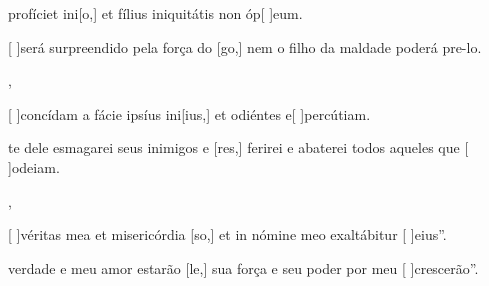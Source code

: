 {    {\item {} profíciet ini[o,] et fílius iniquitátis non óp[ ]{e}um.}%
        {\item {}[ ]{se}rá surpreendido pela força do [go,] nem o filho da maldade poderá pre-lo.},
    {\item {}[ ]{con}cídam a fácie ipsíus ini[ius,] et odiéntes e[ ]{per}{cú}tiam.}%
        {\item {}te dele esmagarei seus inimigos e [res,] ferirei e abaterei todos aqueles que [ ]{o}{dei}am.},
    {\item {}[ ]{vé}ritas mea et misericórdia [so,] et in nómine meo exaltábitur [ ]{e}ius''.}%
        {\item {} verdade e meu amor estarão [le,] sua força e seu poder por meu [ ]{cres}cerão''.}
}